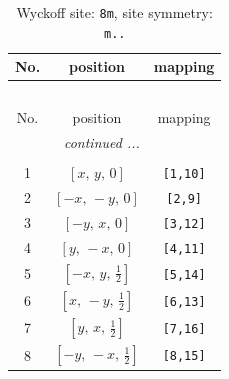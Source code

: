 \documentclass[fleqn,8pt]{jsarticle}
\begin{document}
\begin{longtable}{ccc}
\caption{Wyckoff site: {\tt 8m}, site symmetry: {\tt m..}}
 \\
 \hline \hline
No. & position & mapping \\ \hline \endfirsthead

\multicolumn{2}{l}{\tablename\ \thetable{}} \\
 \hline \hline
No. & position & mapping \\ \hline \endhead

 \hline \hline
\multicolumn{2}{r}{\footnotesize\it continued ...} \\ \endfoot

 \hline \hline
\multicolumn{2}{r}{} \\ \endlastfoot

1 & $\left[ x,\, y,\, 0 \right]$ & {\tt [1,10]} \\ \hline
2 & $\left[ - x,\, - y,\, 0 \right]$ & {\tt [2,9]} \\ \hline
3 & $\left[ - y,\, x,\, 0 \right]$ & {\tt [3,12]} \\ \hline
4 & $\left[ y,\, - x,\, 0 \right]$ & {\tt [4,11]} \\ \hline
5 & $\left[ - x,\, y,\, \frac{1}{2} \right]$ & {\tt [5,14]} \\ \hline
6 & $\left[ x,\, - y,\, \frac{1}{2} \right]$ & {\tt [6,13]} \\ \hline
7 & $\left[ y,\, x,\, \frac{1}{2} \right]$ & {\tt [7,16]} \\ \hline
8 & $\left[ - y,\, - x,\, \frac{1}{2} \right]$ & {\tt [8,15]} \\
\end{longtable}
\renewcommand{\arraystretch}{1.2}
\end{document}
